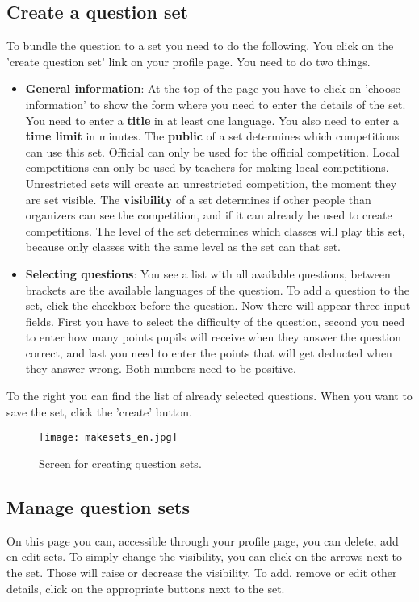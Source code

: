 \documentclass[11pt,a4paper]{report}
\begin{document}
\subsection{Create a question set}
To bundle the question to a set you need to do the following. You click on the 'create question set' link on your profile page. You need to do two things.
\begin{itemize}
\item \textbf{General information}: At the top of the page you have to click on 'choose information' to show the form where you need to enter the details of the set. You need to enter a \textbf{title} in at least one language. You also need to enter a\textbf{ time limit} in minutes. The \textbf{public} of a set determines which competitions can use this set. Official can only be used for the official competition. Local competitions can only be used by teachers for making local competitions. Unrestricted sets will create an unrestricted competition, the moment they are set visible.  The \textbf{visibility} of a set determines if other people than organizers can see the competition, and if it can already be used to create competitions. The level of the set determines which classes will play this set, because only classes with the same level as the set can that set.

\item \textbf{Selecting questions}: You see a list with all available questions, between brackets are the available languages of the question. To add a question to the set, click the checkbox before the question. Now there will appear three input fields. First you have to select the difficulty of the question, second you need to enter how many points pupils will receive when they answer the question correct, and last you need to enter the points that will get deducted when they answer wrong. Both numbers need to be positive.
\end{itemize}
To the right you can find the list of already selected questions. When you want to save the set, click the 'create' button.

\begin{figure}[h!]
\centering
\texttt{[image: makesets\_en.jpg]}
\caption{Screen for creating question sets.}
\label{fig:makesets}
\end{figure}

\subsection{Manage question sets}
On this page you can, accessible through your profile page, you can delete, add en edit sets. To simply change the visibility, you can click on the arrows next to the set. Those will raise or decrease the visibility. To add, remove or edit other details, click on the appropriate buttons next to the set.
\end{document}
